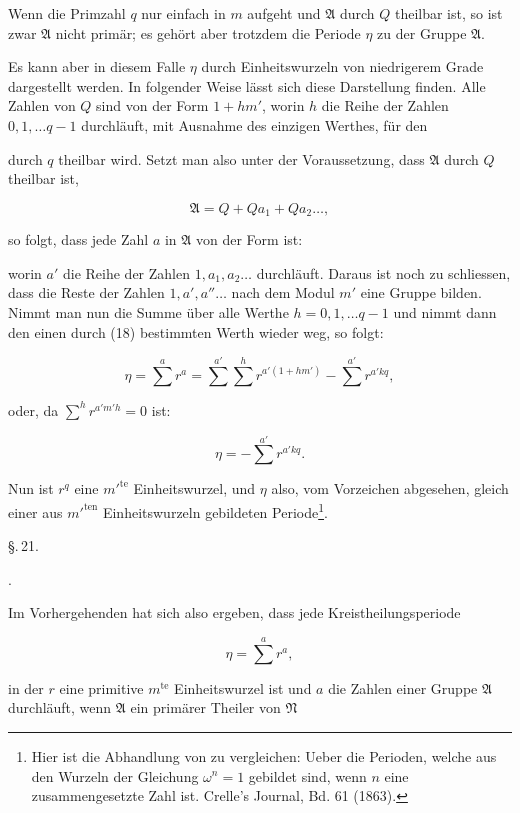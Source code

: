 
Wenn die Primzahl $q$ nur einfach in $m$ aufgeht und $\mathfrak{A}$ durch $Q$ theilbar ist, so ist zwar $\mathfrak{A}$ nicht primär; es gehört aber trotzdem die Periode $\eta$ zu der Gruppe $\mathfrak{A}$.

Es kann aber in diesem Falle $\eta$ durch Einheitswurzeln von niedrigerem Grade dargestellt werden. In folgender Weise lässt sich diese Darstellung finden. Alle Zahlen von $Q$ sind von der Form $1 + hm'$, worin $h$ die Reihe der Zahlen $0, 1, \dots q - 1$ durchläuft, mit Ausnahme des einzigen Werthes, für den


durch $q$ theilbar wird. Setzt man also unter der Voraussetzung, dass $\mathfrak{A}$ durch $Q$ theilbar ist,

\[
\mathfrak{A} = Q + Qa_1 + Qa_2 \dots,
\]

so folgt, dass jede Zahl $a$ in $\mathfrak{A}$ von der Form ist:


worin $a'$ die Reihe der Zahlen $1, a_1, a_2 \dots$ durchläuft. Daraus ist noch zu schliessen, dass die Reste der Zahlen $1, a', a'' \dots$ nach dem Modul $m'$ eine Gruppe bilden. Nimmt man nun die Summe über alle Werthe $h = 0, 1, \dots q - 1$ und nimmt dann den einen durch (18) bestimmten Werth wieder weg, so folgt:

\[
\eta = \sum^a r^a = \sum^{a'} \sum^h r^{a'(1 + hm')} - \sum^{a'} r^{a'kq},
\]

oder, da $\sum^h r^{a'm'h} = 0$ ist:

\[
\eta = -\sum^{a'} r^{a'kq}.
\]

Nun ist $r^q$ eine $m'^{\text{te}}$ Einheitswurzel, und $\eta$ also, vom Vorzeichen abgesehen, gleich einer aus $m'^{\text{ten}}$ Einheitswurzeln gebildeten Periode\footnote{Hier ist die Abhandlung von  zu vergleichen: Ueber die Perioden, welche aus den Wurzeln der Gleichung $\omega^n = 1$ gebildet sind, wenn $n$ eine zusammengesetzte Zahl ist. Crelle's Journal, Bd. 61 (1863).}.

\begin{center}
\S.\,21.

.
\end{center}

Im Vorhergehenden hat sich also ergeben, dass jede Kreistheilungsperiode

\[
\eta = \sum^a r^a,
\]

in der $r$ eine primitive $m^{\text{te}}$ Einheitswurzel ist und $a$ die Zahlen einer Gruppe $\mathfrak{A}$ durchläuft, wenn $\mathfrak{A}$ ein primärer Theiler von $\mathfrak{N}$
